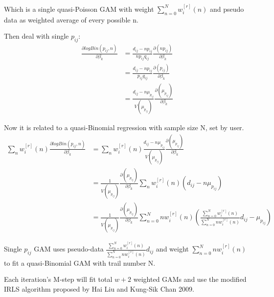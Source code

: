 \documentclass[]{article}
\begin{document}
Which is a single quasi-Poisson GAM with weight $\sum_{n=0}^{N}w_{i}^{[r]}(n)$ and pseudo data as weighted average of every possible n.

Then deal with single $p_{ij}$:
\begin{equation}
	\begin{aligned}
	\frac{\partial logBin(p_{ij},n)}{\partial \beta_{k}}&=\frac{d_{ij}-np_{ij}}{np_{ij}q_{ij}}\frac{\partial(np_{ij})}{\partial \beta_{k}}\\
	&=\frac{d_{ij}-np_{ij}}{p_{ij}q_{ij}}\frac{\partial(p_{ij})}{\partial \beta_{k}}\\
	&=\frac{d_{ij}-n\mu_{p_{ij}}}{V(\mu_{p_{ij}})}\frac{\partial(\mu_{p_{ij}})}{\partial \beta_{k}}
	\end{aligned}
\end{equation}

Now it is related to a quasi-Binomial regression with sample size N, set by user.
\begin{equation}
	\begin{aligned}
	\sum_{n}w_{i}^{[r]}(n)\frac{\partial logBin(p_{ij},n)}{\partial \beta_{k}}
	&=\sum_{n}w_{i}^{[r]}(n)\frac{d_{ij}-n\mu_{p_{ij}}}{V(\mu_{p_{ij}})}\frac{\partial(\mu_{p_{ij}})}{\partial \beta_{k}}\\
	&=\frac{1}{V(\mu_{p_{ij}})}\frac{\partial(\mu_{p_{ij}})}{\partial \beta_{k}}\sum_{n}w_{i}^{[r]}(n)(d_{ij}-n\mu_{p_{ij}})\\
	&=\frac{1}{V(\mu_{p_{ij}})}\frac{\partial(\mu_{p_{ij}})}{\partial \beta_{k}}\sum_{n=0}^{N}nw_{i}^{[r]}(n)(\frac{\sum_{n=0}^{N}w_{i}^{[r]}(n)}{\sum_{n=0}^{N}nw_{i}^{[r]}(n)}d_{ij}-\mu_{p_{ij}})
	\end{aligned}
\end{equation}

Single $p_{ij}$ GAM uses pseudo-data $\frac{\sum_{n=0}^{N}w_{i}^{[r]}(n)}{\sum_{n=0}^{N}nw_{i}^{[r]}(n)}d_{ij}$ and weight $\sum_{n=0}^{N}nw_{i}^{[r]}(n)$ to fit a quasi-Binomial GAM with trail number N.


Each iteration's M-step will fit total $w+2$ weighted GAMs and use the modified IRLS algorithm proposed by Hai Liu and Kung-Sik Chan 2009.
\end{document}
